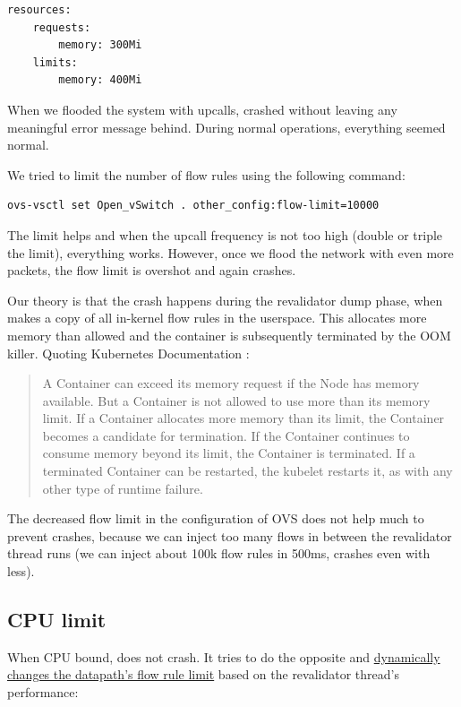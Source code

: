 \begin{verbatim}
resources:
    requests:
        memory: 300Mi
    limits:
        memory: 400Mi
\end{verbatim}

When we flooded the system with upcalls,  crashed without leaving any meaningful error message behind. During normal operations, everything seemed normal.

We tried to limit the number of flow rules using the following command:
\begin{verbatim}
ovs-vsctl set Open_vSwitch . other_config:flow-limit=10000
\end{verbatim}

The limit helps and when the upcall frequency is not too high (double or triple the limit), everything works. However, once we flood the network with even more packets, the flow limit is overshot and  again crashes.

Our theory is that the crash happens during the revalidator dump phase, when  makes a copy of all in-kernel flow rules in the userspace. This allocates more memory than allowed and the container is subsequently terminated by the OOM killer. Quoting Kubernetes Documentation \cite{KubeMemoryLimits}:

\begin{quote}
    A Container can exceed its memory request if the Node has memory available. But a Container is not allowed to use more than its memory limit. If a Container allocates more memory than its limit, the Container becomes a candidate for termination. If the Container continues to consume memory beyond its limit, the Container is terminated. If a terminated Container can be restarted, the kubelet restarts it, as with any other type of runtime failure.
\end{quote}

The decreased flow limit in the configuration of OVS does not help much to prevent crashes, because we can inject too many flows in between the revalidator thread runs (we can inject about 100k flow rules in 500ms,  crashes even with less).

\subsection{CPU limit}
\label{subsec:cpu-limit}

When CPU bound,  does not crash. It tries to do the opposite and \href{https://github.com/openvswitch/ovs/blob/e3ba0be48ca457ab3a1c9f1e3522e82218eca0f9/ofproto/ofproto-dpif-upcall.c\#L1031-L1041}{dynamically changes the datapath's flow rule limit} based on the revalidator thread's performance:

